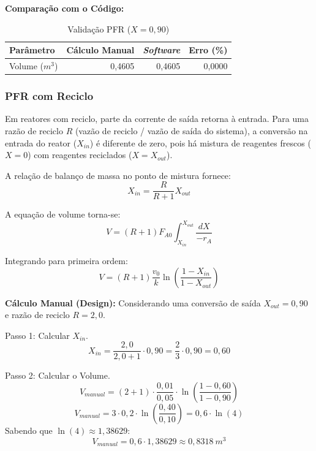 \textbf{Comparação com o Código:}
\begin{table}[H]
    \centering
    \caption{Validação PFR ($X=0,90$)}
    \begin{tabular}{lrrr}
        \toprule
        \textbf{Parâmetro} & \textbf{Cálculo Manual} & \textbf{\textit{Software}} & \textbf{Erro (\%)} \\
        \midrule
        Volume ($m^3$) & 0,4605 & 0,4605 & 0,0000 \\
        \bottomrule
    \end{tabular}
\end{table}

\subsubsection{PFR com Reciclo}

Em reatores com reciclo, parte da corrente de saída retorna à entrada. Para uma razão de reciclo $R$ (vazão de reciclo / vazão de saída do sistema), a conversão na entrada do reator ($X_{in}$) é diferente de zero, pois há mistura de reagentes frescos ($X=0$) com reagentes reciclados ($X=X_{out}$).

A relação de balanço de massa no ponto de mistura fornece:
\begin{equation}
    X_{in} = \frac{R}{R+1} X_{out}
    \label{eq:val_recycle_xin}
\end{equation}

A equação de volume torna-se:
\begin{equation}
    V = (R+1) F_{A0} \int_{X_{in}}^{X_{out}} \frac{dX}{-r_A}
    \label{eq:val_recycle_vol_eq}
\end{equation}

Integrando para primeira ordem:
\begin{equation}
    V = (R+1) \frac{v_0}{k} \ln\left( \frac{1-X_{in}}{1-X_{out}} \right)
    \label{eq:val_recycle_vol_int}
\end{equation}

\textbf{Cálculo Manual (Design):}
Considerando uma conversão de saída $X_{out} = 0,90$ e razão de reciclo $R = 2,0$.

Passo 1: Calcular $X_{in}$.
\begin{equation}
    X_{in} = \frac{2,0}{2,0 + 1} \cdot 0,90 = \frac{2}{3} \cdot 0,90 = 0,60
    \label{eq:val_recycle_xin_calc}
\end{equation}

Passo 2: Calcular o Volume.
\begin{equation}
    V_{manual} = (2 + 1) \cdot \frac{0,01}{0,05} \cdot \ln\left( \frac{1 - 0,60}{1 - 0,90} \right)
    \label{eq:val_recycle_vol_calc_1}
\end{equation}
\begin{equation}
    V_{manual} = 3 \cdot 0,2 \cdot \ln\left( \frac{0,40}{0,10} \right) = 0,6 \cdot \ln(4)
    \label{eq:val_recycle_vol_calc_2}
\end{equation}
Sabendo que $\ln(4) \approx 1,38629$:
\begin{equation}
    V_{manual} = 0,6 \cdot 1,38629 \approx 0,8318 \ m^3
    \label{eq:val_recycle_vol_calc_3}
\end{equation}

